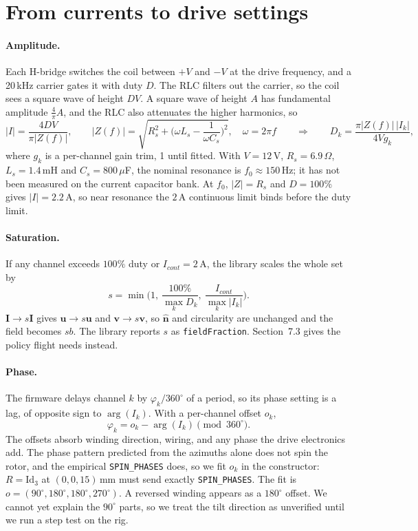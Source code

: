 \documentclass[11pt]{article}
\newcommand{\vb}[1]{\mathbf{#1}}
\newcommand{\uv}[1]{\hat{\mathbf{#1}}}
\newcommand{\Id}{\mathrm{Id}}
\begin{document}
\section{From currents to drive settings}

\paragraph{Amplitude.} Each H-bridge switches the coil between $+V$ and $-V$ at the drive
frequency, and a 20\,kHz carrier gates it with duty $D$. The RLC filters out the carrier, so the
coil sees a square wave of height $DV$. A square wave of height $A$ has fundamental amplitude
$\tfrac4\pi A$, and the RLC also attenuates the higher harmonics, so
\begin{equation}
  |I| = \frac{4DV}{\pi|Z(f)|},\qquad
  |Z(f)| = \sqrt{R_s^2 + \Big(\omega L_s - \frac{1}{\omega C_s}\Big)^2},\quad \omega=2\pi f
  \qquad\Longrightarrow\qquad
  D_k = \frac{\pi|Z(f)|\,|I_k|}{4V g_k},
\end{equation}
where $g_k$ is a per-channel gain trim, 1 until fitted. With $V = 12$\,V, $R_s = 6.9\,\Omega$,
$L_s = 1.4$\,mH and $C_s = 800\,\mu$F, the nominal resonance is $f_0\approx150$\,Hz; it has not
been measured on the current capacitor bank. At $f_0$, $|Z| = R_s$ and $D=100\%$ gives
$|I| = 2.2$\,A, so near resonance the $2$\,A continuous limit binds before the duty limit.

\paragraph{Saturation.} If any channel exceeds $100\%$ duty or $I_{cont}=2$\,A, the library scales
the whole set by
\begin{equation}
  s = \min\!\Big(1,\ \frac{100\%}{\max_k D_k},\ \frac{I_{cont}}{\max_k |I_k|}\Big).
\end{equation}
$\vb I\to s\vb I$ gives $\vb u\to s\vb u$ and $\vb v\to s\vb v$, so $\uv n$ and circularity are
unchanged and the field becomes $sb$. The library reports $s$ as \texttt{fieldFraction}.
Section~7.3 gives the policy flight needs instead.

\paragraph{Phase.} The firmware delays channel $k$ by $\varphi_k/360^\circ$ of a period, so its
phase setting is a lag, of opposite sign to $\arg(I_k)$. With a per-channel offset $o_k$,
\begin{equation}
  \varphi_k = o_k - \arg(I_k) \pmod{360^\circ}.
\end{equation}
The offsets absorb winding direction, wiring, and any phase the drive electronics add. The phase
pattern predicted from the azimuths alone does not spin the rotor, and the empirical
\texttt{SPIN\_PHASES} does, so we fit $o_k$ in the constructor: $R=\Id_3$ at $(0,0,15)$\,mm must
send exactly \texttt{SPIN\_PHASES}. The fit is $o = (90^\circ, 180^\circ, 180^\circ, 270^\circ)$.
A reversed winding appears as a $180^\circ$ offset. We cannot yet explain the $90^\circ$ parts, so
we treat the tilt direction as unverified until we run a step test on the rig.
\end{document}
